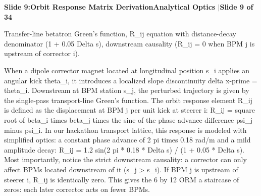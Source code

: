 \documentclass[11pt,a4paper]{article}
\begin{document}
\clearpage
\hypertarget{slide.9}{}
{}
\noindent\begin{tcolorbox}[colback=navy,colframe=navy,left=6pt,right=6pt,top=3pt,bottom=3pt,boxrule=0pt,arc=2pt]
{\large\bfseries\color{white}Slide 9:\enspace Orbit Response Matrix Derivation}\hfill{\footnotesize\bfseries\color{white!85!lightbg}Analytical Optics \enspace$|$\enspace Slide 9 of 34}
\end{tcolorbox}
\vspace{0.2em}
\begin{tcolorbox}[colback=lightbg,colframe=bordergray,title={\footnotesize\bfseries\color{darkgray}Slide Visual Blueprint},fontupper=\small,left=6pt,right=6pt,top=2.5pt,bottom=2.5pt,boxrule=0.6pt,arc=2.5pt]
Transfer-line betatron Green's function, R\_ij equation with distance-decay denominator (1 + 0.05 Delta s), downstream causality (R\_ij = 0 when BPM j is upstream of corrector i).
\end{tcolorbox}
\vspace{0.2em}
\begin{tcolorbox}[colback=white,colframe=primaryblue,title={\footnotesize\bfseries\color{white}Spoken Presenter Script},fontupper=\small,left=6pt,right=6pt,top=3pt,bottom=3pt,boxrule=0.8pt,arc=2.5pt]
When a dipole corrector magnet located at longitudinal position s\_i applies an angular kick theta\_i, it introduces a localized slope discontinuity delta x-prime = theta\_i. Downstream at BPM station s\_j, the perturbed trajectory is given by the single-pass transport-line Green's function. The orbit response element R\_ij is defined as the displacement at BPM j per unit kick at steerer i: R\_ij = square root of beta\_i times beta\_j times the sine of the phase advance difference psi\_j minus psi\_i. In our hackathon transport lattice, this response is modeled with simplified optics: a constant phase advance of 2 pi times 0.18 rad/m and a mild amplitude decay: R\_ij = 1.2 sin(2 pi * 0.18 * Delta s) / (1 + 0.05 * Delta s). Most importantly, notice the strict downstream causality: a corrector can only affect BPMs located downstream of it (s\_j > s\_i). If BPM j is upstream of steerer i, R\_ij is identically zero. This gives the 6 by 12 ORM a staircase of zeros: each later corrector acts on fewer BPMs.
\end{tcolorbox}
\vspace{0.2em}
\end{document}
